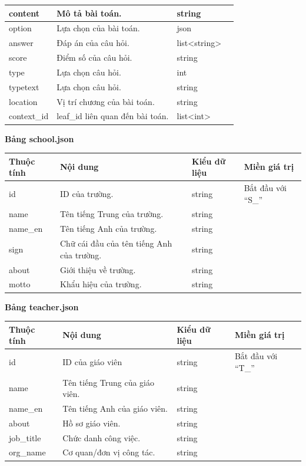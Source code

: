 \newpage
\begin{center}
\begin{tabular}{|| m{6em}  m{10em}  m{8em}  m{8em}||} 
 \hline
 content & Mô tả bài toán. & string &  \\ 
 \hline
 option & Lựa chọn của bài toán. & json & \\
 \hline
 answer & Đáp án của câu hỏi. & list<string> & \\
 \hline
 score & Điểm số của câu hỏi. & string & \\
 \hline
 type & Lựa chọn câu hỏi. & int & \\
 \hline
 typetext & Lựa chọn câu hỏi. & string & \\
 \hline
 location & Vị trí chương của bài toán. & string & \\
 \hline
 context\_id & leaf\_id liên quan đến bài toán. & list<int> &  \\ [1ex] 
 \hline
\end{tabular}
\end{center}
\textbf{Bảng school.json}
\begin{center}
\begin{tabular}{|| m{6em}  m{10em}  m{6em}  m{11em}||} 
 \hline
 \textbf{Thuộc tính} & \textbf{Nội dung} & \textbf{Kiểu dữ liệu} & \textbf{Miền giá trị} \\ [0.5ex] 
 \hline\hline
 id & ID của trường. & string & Bắt đầu với “S\_”\\
 \hline
 name & Tên tiếng Trung của trường. & string &  \\ \hline
 name\_en & Tên tiếng Anh của trường. & string &  \\ 
 \hline
  sign & Chữ cái đầu của tên tiếng Anh của trường. & string & \\ \hline
 about & Giới thiệu về trường. & string & \\ 
 \hline
 motto & Khẩu hiệu của trường. & string &  \\ [1ex] 
 \hline
\end{tabular}
\end{center}
\newpage
\textbf{Bảng teacher.json}
\begin{center}
\begin{tabular}{|| m{6em}  m{10em}  m{6em}  m{11em}||} 
 \hline
 \textbf{Thuộc tính} & \textbf{Nội dung} & \textbf{Kiểu dữ liệu} & \textbf{Miền giá trị} \\ [0.5ex] 
 \hline\hline
 id & ID của giáo viên & string & Bắt đầu với “T\_”\\
 \hline
 name & Tên tiếng Trung của giáo viên. & string &  \\ \hline
 name\_en & Tên tiếng Anh của giáo viên. & string &  \\ 
 \hline
  about & Hồ sơ giáo viên. & string & \\ \hline
 job\_title & Chức danh công việc. & string & \\ 
 \hline
 org\_name & Cơ quan/đơn vị công tác. & string &  \\ [1ex] 
 \hline
\end{tabular}
\end{center}
